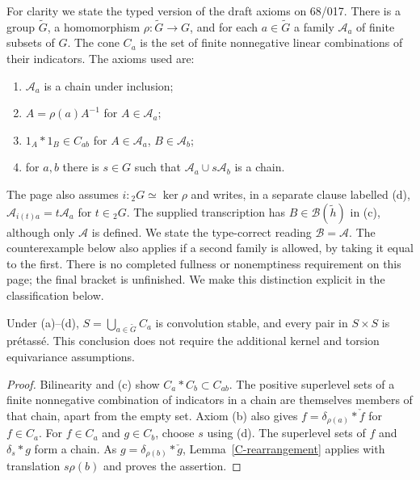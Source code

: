 For clarity we state the typed version of the draft axioms on 68/017.
There is a group $\widetilde G$, a homomorphism
$\rho:\widetilde G\to G$, and for each $a\in\widetilde G$ a family
$\mathcal A_a$ of finite subsets of $G$. The cone $C_a$ is the set of finite
nonnegative linear combinations of their indicators. The axioms used are:
\begin{enumerate}
\item[(a)] $\mathcal A_a$ is a chain under inclusion;
\item[(b)] $A=\rho(a)A^{-1}$ for $A\in\mathcal A_a$;
\item[(c)] $1_A*1_B\in C_{ab}$ for $A\in\mathcal A_a$, $B\in\mathcal A_b$;
\item[(d)] for $a,b$ there is $s\in G$ such that
      $\mathcal A_a\cup s\mathcal A_b$ is a chain.
\end{enumerate}
The page also assumes $i:{}_2G\simeq\ker\rho$ and writes, in a separate
clause labelled (d),
$\mathcal A_{i(t)a}=t\mathcal A_a$ for $t\in{}_2G$.
The supplied transcription has $B\in\mathcal B(\widetilde h)$ in (c),
although only $\mathcal A$ is defined. We state the type-correct reading
$\mathcal B=\mathcal A$. The counterexample below also applies if a second
family is allowed, by taking it equal to the first. There is no completed
fullness or nonemptiness requirement on this page; the final bracket is
unfinished. We make this distinction explicit in the classification below.

\begin{theorem}\label{C-chain-true}
Under (a)--(d), $S=\bigcup_{a\in\widetilde G}C_a$ is convolution stable,
and every pair in $S\times S$ is pr\'etass\'e. This conclusion does not
require the additional kernel and torsion equivariance assumptions.
\end{theorem}
\begin{proof}
Bilinearity and (c) show $C_a*C_b\subset C_{ab}$.
The positive superlevel sets of a finite nonnegative combination of
indicators in a chain are themselves members of that chain, apart from
the empty set. Axiom (b) also gives $f=\delta_{\rho(a)}*\check f$ for
$f\in C_a$. For $f\in C_a$ and $g\in C_b$, choose $s$ using (d).
The superlevel sets of $f$ and $\delta_s*g$ form a chain. As
$g=\delta_{\rho(b)}*\check g$, Lemma~\ref{C-rearrangement} applies with
translation $s\rho(b)$ and proves the assertion.
\end{proof}

